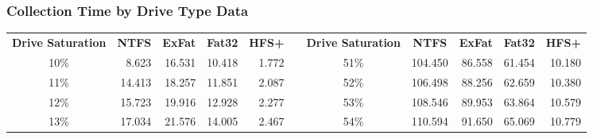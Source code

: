\documentclass[12pt]{article}
\begin{document}
\newpage
\subsubsection{Collection Time by Drive Type Data}

\begin{center}
  \tiny
    \begin{tabular}{|c|r|r|r|r|r|c|r|r|r|r|}
    \cline{1-5} \cline{7-11}
    \textbf{Drive Saturation} & \multicolumn{1}{c|}{\textbf{NTFS}} & \multicolumn{1}{c|}{\textbf{ExFat}} & \multicolumn{1}{c|}{\textbf{Fat32}} & \multicolumn{1}{c|}{\textbf{HFS+}} & \multicolumn{1}{c|}{\textbf{}} & \textbf{Drive Saturation} & \multicolumn{1}{c|}{\textbf{NTFS}} & \multicolumn{1}{c|}{\textbf{ExFat}} & \multicolumn{1}{c|}{\textbf{Fat32}} & \multicolumn{1}{c|}{\textbf{HFS+}} \\ \cline{1-5} \cline{7-11} 
    10\%                      & 8.623                              & 16.531                              & 10.418                              & 1.772                              &                                & 51\%                      & 104.450                            & 86.558                              & 61.454                              & 10.180                             \\ \cline{1-5} \cline{7-11} 
    11\%                      & 14.413                             & 18.257                              & 11.851                              & 2.087                              &                                & 52\%                      & 106.498                            & 88.256                              & 62.659                              & 10.380                             \\ \cline{1-5} \cline{7-11} 
    12\%                      & 15.723                             & 19.916                              & 12.928                              & 2.277                              &                                & 53\%                      & 108.546                            & 89.953                              & 63.864                              & 10.579                             \\ \cline{1-5} \cline{7-11} 
    13\%                      & 17.034                             & 21.576                              & 14.005                              & 2.467                              &                                & 54\%                      & 110.594                            & 91.650                              & 65.069                              & 10.779                             \\ \cline{1-5} \cline{7-11} 

\end{tabular}
\end{center}
\end{document}
